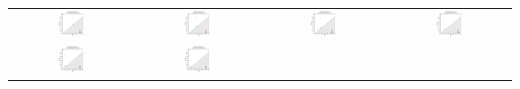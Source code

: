 \documentclass[ma]{uncgdissertationexp}
\theoremstyle{plain}
\theoremstyle{definition}
\theoremstyle{remark}
\begin{document}
\begin{table}[H]
\begin{center}
    \begin{tabular}{cccc}
         \includegraphics[width=0.24\textwidth]{Final Run, (rect prism ring 40 mm cut) persdia.png} &
         \includegraphics[width=0.24\textwidth]{Final Run, (rect prism ring 35 mm cut) persdia.png} &  
         \includegraphics[width=0.24\textwidth]{Final Run, (rect prism ring 30 mm cut) persdia.png} &
         \includegraphics[width=0.24\textwidth]{Final Run, (rect prism ring 25 mm cut) persdia.png} \\ 
         \includegraphics[width=0.24\textwidth]{Final Run, (rect prism ring 20 mm cut) persdia.png} & 
         \includegraphics[width=0.24\textwidth]{Final Run, (rect prism ring 15 mm cut) persdia.png} &

\end{tabular}
\end{center}
\end{table}
\end{document}
